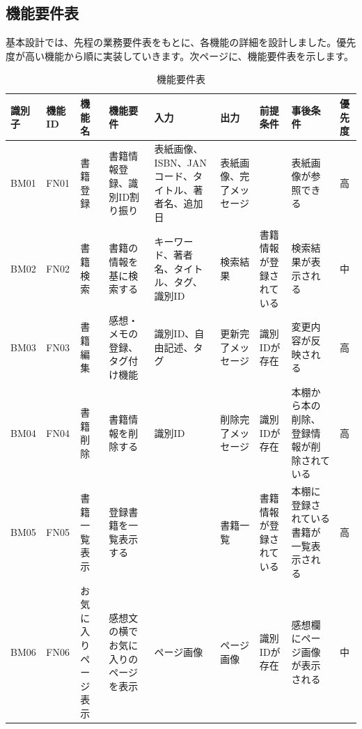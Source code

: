 \documentclass[a4paper, 11pt, titlepage]{jsarticle}
\begin{document}
\subsection{機能要件表}
基本設計では、先程の業務要件表をもとに、各機能の詳細を設計しました。優先度が高い機能から順に実装していきます。次ページに、機能要件表を示します。
\begin{table}[htbp]
  \centering
  \begin{tabular}{|>{\centering\arraybackslash}m{0.9cm}|>{\centering\arraybackslash}m{0.9cm}|>{\centering\arraybackslash}m{1.3cm}|>{\centering\arraybackslash}m{1.5cm}|>{\centering\arraybackslash}m{1.8cm}|>{\centering\arraybackslash}m{1.2cm}|>{\centering\arraybackslash}m{1.3cm}|>{\centering\arraybackslash}m{1.3cm}|>{\centering\arraybackslash}m{0.3cm}|}
    \hline
    \textbf{識別子} & \textbf{機能ID} & \textbf{機能名} & \textbf{機能要件} & \textbf{入力} & \textbf{出力} & \textbf{前提条件} & \textbf{事後条件} & \textbf{優先度} \\
    \hline\hline
    BM01 & FN01 & 書籍登録 & 書籍情報登録、識別ID割り振り & 表紙画像、ISBN、JANコード、タイトル、著者名、追加日 & 表紙画像、完了メッセージ & & 表紙画像が参照できる & 高 \\
    \hline
    BM02 & FN02 & 書籍検索 & 書籍の情報を基に検索する & キーワード、著者名、タイトル、タグ、識別ID & 検索結果 & 書籍情報が登録されている & 検索結果が表示される & 中 \\
    \hline
    BM03 & FN03 & 書籍編集 & 感想・メモの登録、タグ付け機能 & 識別ID、自由記述、タグ & 更新完了メッセージ & 識別IDが存在 & 変更内容が反映される & 高 \\
    \hline
    BM04 & FN04 & 書籍削除 & 書籍情報を削除する & 識別ID & 削除完了メッセージ & 識別IDが存在 & 本棚から本の削除、登録情報が削除されている & 高 \\
    \hline
    BM05 & FN05 & 書籍一覧表示 & 登録書籍を一覧表示する & & 書籍一覧 & 書籍情報が登録されている & 本棚に登録されている書籍が一覧表示される & 高 \\
    \hline
    BM06 & FN06 & お気に入りページ表示 & 感想文の横でお気に入りのページを表示 & ページ画像 & ページ画像 & 識別IDが存在 & 感想欄にページ画像が表示される & 中 \\
    \hline
  \end{tabular}
  \caption{機能要件表}
  \label{tab:functions}
\end{table}
\clearpage
\end{document}
